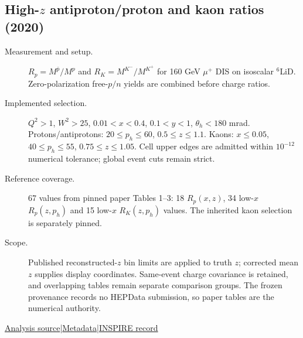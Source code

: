 \documentclass[11pt,a4paper]{article}
\newcommand{\id}[1]{{\small\texttt{\detokenize{#1}}}}
\begin{document}
\subsection{\texorpdfstring{High-$z$ antiproton/proton and kaon ratios (2020)}{High-z antiproton/proton and kaon ratios (2020)}}
\id{COMPASS_2020_I1788430}\quad\cite{r1788430}
\begin{description}
\item[Measurement and setup.] $R_p=M^{\bar p}/M^p$ and $R_K=M^{K^-}/M^{K^+}$ for 160 GeV $\mu^+$ DIS on isoscalar $^6$LiD. Zero-polarization free-$p/n$ yields are combined before charge ratios.
\item[Implemented selection.] $Q^2>1$, $W^2>25$, $0.01<x<0.4$, $0.1<y<1$, $\theta_h<180$ mrad. Protons/antiprotons: $20\le p_h\le60$, $0.5\le z\le1.1$. Kaons: $x\le0.05$, $40\le p_h\le55$, $0.75\le z\le1.05$. Cell upper edges are admitted within $10^{-12}$ numerical tolerance; global event cuts remain strict.
\item[Reference coverage.] 67 values from pinned paper Tables 1--3: 18 $R_p(x,z)$, 34 low-$x$ $R_p(z,p_h)$ and 15 low-$x$ $R_K(z,p_h)$ values. The inherited kaon selection is separately pinned.
\item[Scope.] Published reconstructed-$z$ bin limits are applied to truth $z$; corrected mean $z$ supplies display coordinates. Same-event charge covariance is retained, and overlapping tables remain separate comparison groups. The frozen provenance records no HEPData submission, so paper tables are the numerical authority.
\end{description}
{\small\href{https://github.com/apapaefs/HerwigPolarizedPheno/blob/105045bd757aaa6b217e87811dc5f9a22a8d1cef/analyses/rivet/dis/COMPASS_2020_I1788430.cc}{Analysis source}\quad|\quad\href{https://github.com/apapaefs/HerwigPolarizedPheno/blob/105045bd757aaa6b217e87811dc5f9a22a8d1cef/analyses/rivet/dis/COMPASS_2020_I1788430.info}{Metadata}\quad|\quad\href{https://inspirehep.net/literature/1788430}{INSPIRE record}}
\end{document}
